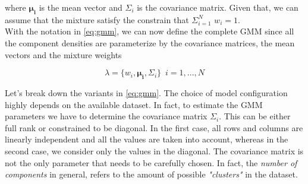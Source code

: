 \noindent where $\mathbf{\mu_{i}}$ is the mean vector and $\Sigma_{i}$ is the covariance matrix. Given that, we can assume that the mixture satisfy the constrain that $\Sigma_{i=1}^{N} \,\, w_{i} = 1$. \\

\noindent With the notation in \ref{eq:gmm}, we can now define the complete GMM since all the component densities are parameterize by the covariance matrices, the mean vectors and the mixture weights \cite{reynolds2000speaker}

\begin{equation}
\label{eq:gmm}
	\lambda = \{ w_{i}, \mathbf{\mu_{i}}, \Sigma_{i}\} \,\,\, i = 1, ... , N
\end{equation}

\noindent Let's break down the variants in \ref{eq:gmm}. The choice of model configuration highly depends on the available dataset. In fact, to estimate the GMM parameters we have to determine the covariance matrix $\Sigma_{i}$. This can be either full rank or constrained to be diagonal. In the first case, all rows and columns are linearly independent and all the values are taken into account, whereas in the second case, we consider only the values in the diagonal. The covariance matrix is not the only parameter that needs to be carefully chosen. In fact, the \textit{number of components} in general, refers to the amount of possible  \textit{"clusters"} in the dataset. \\

